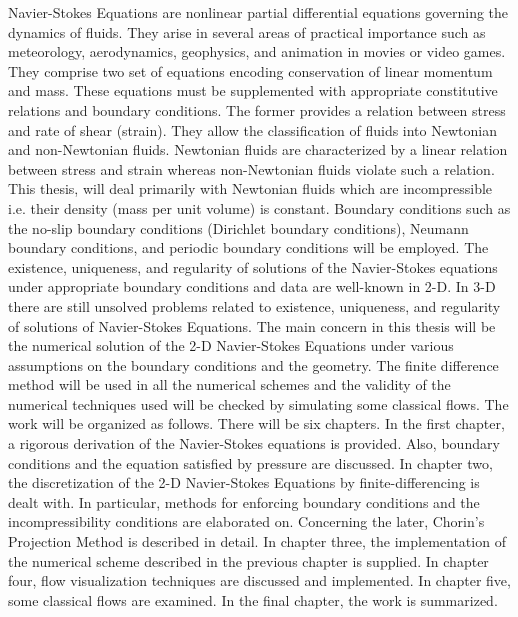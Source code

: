 Navier-Stokes Equations are nonlinear partial differential equations governing the dynamics of fluids. They arise in several areas of practical importance such as meteorology, aerodynamics, geophysics, and animation in movies or video games. They comprise two set of equations encoding conservation of linear momentum and mass. These equations must be supplemented with appropriate constitutive relations and boundary conditions. The former provides a relation between stress and rate of shear (strain). They allow the classification of fluids into Newtonian and non-Newtonian fluids. Newtonian fluids are characterized by a linear relation between stress and strain whereas non-Newtonian fluids violate such a relation. This thesis, will deal primarily with Newtonian fluids which are incompressible i.e. their density (mass per unit volume) is constant. Boundary conditions such as the no-slip boundary conditions (Dirichlet boundary conditions), Neumann boundary conditions, and periodic boundary conditions will be employed. The existence, uniqueness, and regularity of solutions of the Navier-Stokes equations under appropriate boundary conditions and data are well-known in 2-D.  In 3-D there are still unsolved problems related to existence, uniqueness, and regularity of solutions of Navier-Stokes Equations. The main concern in this thesis will be the numerical solution of the 2-D Navier-Stokes Equations under various assumptions on the boundary conditions and the geometry. The finite difference method will be used in all the numerical schemes and the validity of the numerical techniques used will be checked by simulating some classical flows. The work will be organized as follows. There will be six chapters. In the first chapter, a rigorous derivation of the Navier-Stokes equations is provided. Also, boundary conditions and the equation satisfied by pressure are discussed.  In chapter two, the discretization of the 2-D Navier-Stokes Equations by finite-differencing is dealt with. In particular, methods for enforcing boundary conditions and the incompressibility conditions are elaborated on. Concerning the later, Chorin's Projection Method is described in detail.  In chapter three, the implementation of the numerical scheme described in the previous chapter is supplied. In chapter four, flow visualization techniques are discussed and implemented. In chapter five, some classical flows are examined. In the final chapter, the work is summarized.
%
%
%
%
%
%
% 
%
%
%
%
%
%
%
%
%